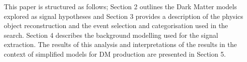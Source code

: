 

This paper is structured as follows; Section 2 outlines the Dark Matter models explored as signal hypotheses and Section 3 provides a 
description of the physics object reconstruction and the event selection and categorisation used in the search. Section 4 describes the 
background modelling used for the signal extraction. The results of this analysis and interpretations of the results in the context of 
simplified models for DM production are presented in Section 5.

